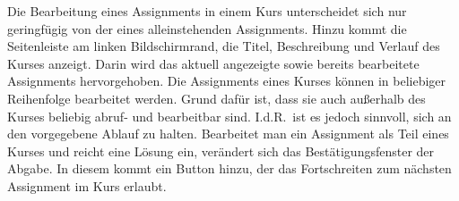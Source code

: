 Die Bearbeitung eines Assignments in einem Kurs unterscheidet sich nur geringfügig von der eines alleinstehenden Assignments.
Hinzu kommt die Seitenleiste am linken Bildschirmrand, die Titel, Beschreibung und Verlauf des Kurses anzeigt.
Darin wird das aktuell angezeigte sowie bereits bearbeitete Assignments hervorgehoben.
Die Assignments eines Kurses können in beliebiger Reihenfolge bearbeitet werden.
Grund dafür ist, dass sie auch außerhalb des Kurses beliebig abruf- und bearbeitbar sind.
I.d.R.\ ist es jedoch sinnvoll, sich an den vorgegebene Ablauf zu halten.
Bearbeitet man ein Assignment als Teil eines Kurses und reicht eine Lösung ein, verändert sich das Bestätigungsfenster der Abgabe.
In diesem kommt ein Button hinzu, der das Fortschreiten zum nächsten Assignment im Kurs erlaubt.

